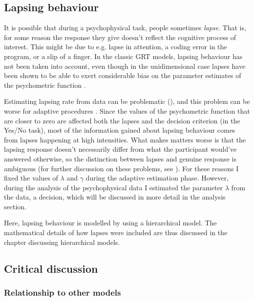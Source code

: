 \documentclass{article}\usepackage{knitr}
\begin{document}
\subsection{Lapsing behaviour}
\label{sec:lapses_general}

It is possible that during a psychophysical task, people sometimes \textit{lapse}. That is, for some reason the response they give doesn't reflect the cognitive process of interest. This might be due to e.g. lapse in attention, a coding error in the program, or a slip of a finger. In the classic GRT models, lapsing behaviour has not been taken into account, even though in the unidimensional case lapses have been shown to be able to exert considerable bias on the parameter estimates of the psychometric function \citep{wichmannhill2001}. 

Estimating lapsing rate from data can be problematic (\cite{wichmannhill2001, treutwein1999}), and this problem can be worse for adaptive procedures \citep{prins2012}. Since the values of the psychometric function that are closer to zero are affected both the lapses and the decision criterion (in the Yes/No task), most of the information gained about lapsing behaviour comes from lapses happening at high intensities. What makes matters worse is that the lapsing response doesn't necessarily differ from what the participant would've answered otherwise, so the distinction between lapses and genuine response is ambiguous (for further discussion on these problems, see \cite{prins2012}). For these reasons I fixed the values of $\lambda$ and $\gamma$ during the adaptive estimation phase. However, during the analysis of the psychophysical data I estimated the parameter $\lambda$ from the data, a decision, which will be discussed in more detail in the analysis section.

Here, lapsing behaviour is modelled by using a hierarchical model. The mathematical details of how lapses were included are thus discussed in the chapter discussing hierarchical models. 






\subsection{Critical discussion}
\label{sec:grt_criticism}

\subsubsection{Relationship to other models}
\end{document}
